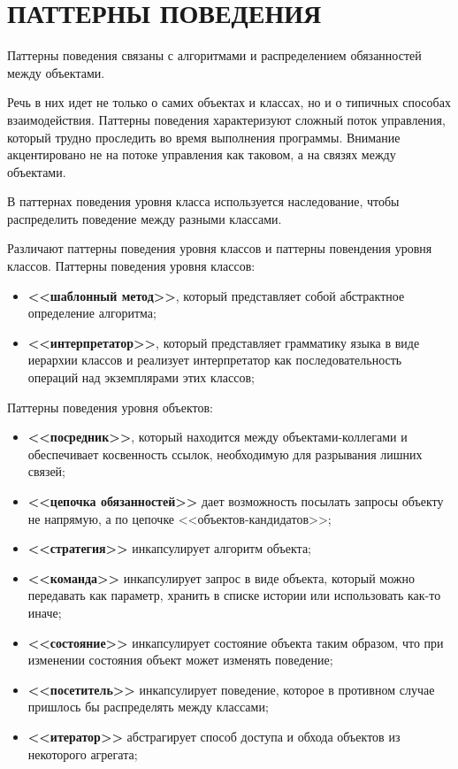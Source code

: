 \section{ПАТТЕРНЫ ПОВЕДЕНИЯ}

Паттерны поведения связаны с алгоритмами и распределением обязанностей между объектами.

Речь в них идет не только о самих объектах и классах, но и о типичных
способах взаимодействия. Паттерны поведения характеризуют сложный поток
управления, который трудно проследить во время выполнения программы.
Внимание акцентировано не на потоке управления как таковом, а на связях между
объектами.

В паттернах поведения уровня класса используется наследование, чтобы распределить 
поведение между разными классами.

Различают паттерны поведения уровня классов и паттерны повендения уровня классов.
Паттерны поведения уровня классов:
\begin{itemize}
\item
  \textbf{<<шаблонный метод>>}, который представляет собой абстрактное определение алгоритма;
\item
  \textbf{<<интерпретатор>>}, который представляет грамматику языка в виде иерархии классов
  и реализует интерпретатор как последовательность операций над
  экземплярами этих классов;
\end{itemize}

Паттерны поведения уровня объектов:
\begin{itemize}
  
\item
  \textbf{<<посредник>>}, который находится между объектами-коллегами и
  обеспечивает косвенность ссылок, необходимую для разрывания лишних связей;

\item
  \textbf{<<цепочка обязанностей>>} дает возможность посылать запросы объекту не напрямую,
  а по цепочке <<объектов-кандидатов>>;

\item
  \textbf{<<стратегия>>} инкапсулирует алгоритм объекта;

\item
  \textbf{<<команда>>} инкапсулирует запрос в виде объекта,
  который можно передавать как параметр, хранить в списке истории 
  или использовать как-то иначе;

\item
  \textbf{<<состояние>>} инкапсулирует состояние объекта таким образом,
  что при изменении состояния объект может изменять поведение;

\item
  \textbf{<<посетитель>>} инкапсулирует поведение, которое в противном
  случае пришлось бы распределять между классами;

\item
  \textbf{<<итератор>>} абстрагирует способ доступа и
  обхода объектов из некоторого агрегата;

\end{itemize}

